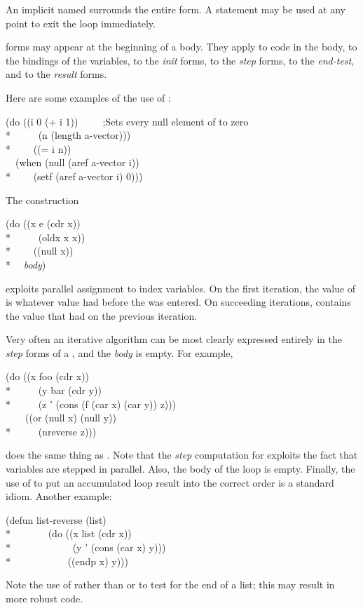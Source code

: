 \begin{defmac}
An implicit  named {\nil} surrounds the entire  form.
A  statement may be used at any point to exit the loop
immediately.

 forms may appear at the beginning of a  body.
They apply to code in the  body, to the bindings of the 
variables, to the \emph{init} forms, to the \emph{step} forms,
to the \emph{end-test}, and to the \emph{result} forms.

Here are some examples of the use of :
\begin{lisp}
(do ((i 0 (+ i 1))~~~~~;\textrm{Sets every null element of  to zero} \\*
~~~~~(n (length a-vector))) \\*
~~~~((= i n)) \\
~~(when (null (aref a-vector i)) \\*
~~~~(setf (aref a-vector i) 0)))
\end{lisp}
The construction
\begin{lisp}
(do ((x e (cdr x)) \\*
~~~~~(oldx x x)) \\*
~~~~((null x)) \\*
~~\emph{body})
\end{lisp}
exploits parallel assignment to index variables.  On the first
iteration, the value of  is whatever value  had before
the  was entered.  On succeeding iterations,  contains
the value that  had on the previous iteration. 

Very often an iterative algorithm can be most clearly expressed entirely
in the \emph{step} forms of a , and the \emph{body} is empty.
For example,
\begin{lisp}
(do ((x foo (cdr x)) \\*
~~~~~(y bar (cdr y)) \\*
~~~~~(z '{\emptylist} (cons (f (car x) (car y)) z))) \\
~~~~((or (null x) (null y)) \\*
~~~~~(nreverse z)))
\end{lisp}
does the same thing as .  Note that the \emph{step}
computation for  exploits the fact that variables are stepped in parallel.
Also, the body of the loop is empty.  Finally, the use of 
to put an accumulated  loop result into the correct order
is a standard idiom.  Another example:
\begin{lisp}
(defun list-reverse (list) \\*
~~~~~~~(do ((x list (cdr x)) \\*
~~~~~~~~~~~~(y '{\emptylist} (cons (car x) y))) \\*
~~~~~~~~~~~((endp x) y)))
\end{lisp}
Note the use of  rather than  or 
to test for the end of a list; this may result in more robust code.


\end{defmac}
